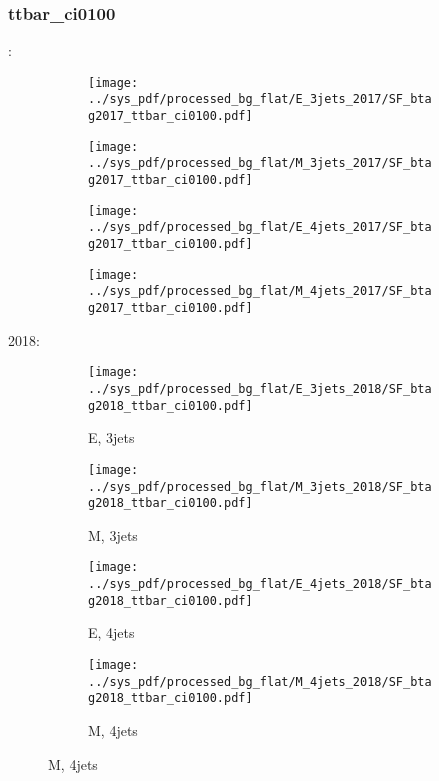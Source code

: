 \documentclass{beamer}
\begin{document}
\begin{frame}
\frametitle{ttbar_ci0100}
\fontsize{5}{1}:
\begin{figure}
\centering
\begin{subfigure}[b]{0.24\textwidth}
\texttt{[image: ../sys\_pdf/processed\_bg\_flat/E\_3jets\_2017/SF\_btag2017\_ttbar\_ci0100.pdf]}
\end{subfigure}
\begin{subfigure}[b]{0.24\textwidth}
\texttt{[image: ../sys\_pdf/processed\_bg\_flat/M\_3jets\_2017/SF\_btag2017\_ttbar\_ci0100.pdf]}
\end{subfigure}
\begin{subfigure}[b]{0.24\textwidth}
\texttt{[image: ../sys\_pdf/processed\_bg\_flat/E\_4jets\_2017/SF\_btag2017\_ttbar\_ci0100.pdf]}
\end{subfigure}
\begin{subfigure}[b]{0.24\textwidth}
\texttt{[image: ../sys\_pdf/processed\_bg\_flat/M\_4jets\_2017/SF\_btag2017\_ttbar\_ci0100.pdf]}
\end{subfigure}
\end{figure}
2018:
\begin{figure}
\centering
\begin{subfigure}[b]{0.24\textwidth}
\texttt{[image: ../sys\_pdf/processed\_bg\_flat/E\_3jets\_2018/SF\_btag2018\_ttbar\_ci0100.pdf]}
\captionsetup{font=tiny}
\caption{E, 3jets}
\end{subfigure}
\begin{subfigure}[b]{0.24\textwidth}
\texttt{[image: ../sys\_pdf/processed\_bg\_flat/M\_3jets\_2018/SF\_btag2018\_ttbar\_ci0100.pdf]}
\captionsetup{font=tiny}
\caption{M, 3jets}
\end{subfigure}
\begin{subfigure}[b]{0.24\textwidth}
\texttt{[image: ../sys\_pdf/processed\_bg\_flat/E\_4jets\_2018/SF\_btag2018\_ttbar\_ci0100.pdf]}
\captionsetup{font=tiny}
\caption{E, 4jets}
\end{subfigure}
\begin{subfigure}[b]{0.24\textwidth}
\texttt{[image: ../sys\_pdf/processed\_bg\_flat/M\_4jets\_2018/SF\_btag2018\_ttbar\_ci0100.pdf]}
\captionsetup{font=tiny}
\caption{M, 4jets}
\end{subfigure}
\end{figure}
\end{frame}
\end{document}
